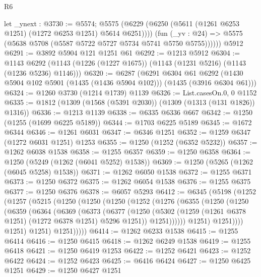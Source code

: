 \begin{lexlean}{R6}
\begin{coremodule}
          let _ynext : @3730 := @5574;
          @5575 (@6229 (@6250 (@5611 (@1261 @6253 @1251) (@1272 @6253 @1251) @5614 @6251))))
          (fun (_yv : @24) => @5575 (@5638 @5708 (@5587 @5722 @5727 @5734 @5741 @5750 @5755))))))
    @5912
@6291 := @3892 @5904 @121 @1251 @61
@6292 := @1213 @5912
@6304 := @1143 @6292 (@1143 (@1226 (@1227 @1675)) (@1143 (@1231 @5216) (@1143 (@1236 @5236) @1146)))
@6320 := @6287
    (@6291
      @6304
      @61
      @6292
      (@1430 @5904 @102 @5901 (@1435 (@1436 @5904 @102)))
      (@1435 (@3916 @6304 @61)))
@6324 := @1260 @3730 (@1214 @1739) @1139
@6326 := List.casesOn.{0, 0} @1152
@6335 := @1812 (@1309 (@1568 (@5391 @2030)) (@1309 (@1313 (@131 @1826)) @1316))
@6336 := @1213 @1139
@6338 := @6335 @6336 @667
@6342 := @1250 (@1255 (@1699 @6225 @5189))
@6344 := @1703 @6225 @5189
@6345 := @1672 @6344
@6346 := @1261 @6031
@6347 := @6346 @1251
@6352 := @1259 @6347 (@1272 @6031 @1251) @1253
@6355 := @1250 (@1252 (@6352 @5232))
@6357 := @1262 @6038 @1538
@6358 := @1255 @6357
@6359 := @1250 @6358
@6364 := @1250 (@5249 (@1262 (@6041 @5252) @1538))
@6369 := @1250 (@5265 (@1262 (@6045 @5258) @1538))
@6371 := @1262 @6050 @1538
@6372 := @1255 @6371
@6373 := @1250 @6372
@6375 := @1262 @6054 @1538
@6376 := @1255 @6375
@6377 := @1250 @6376
@6378 := @6057 @5293
@6412 := @6345
    (@5198
      (@1252
        (@1257
          (@5215
            (@1250
              (@1250
                (@1250
                  (@1252
                    (@1276
                      (@6355
                        (@1250
                          (@1250
                            (@6359
                              (@6364
                                (@6369
                                  (@6373
                                    (@6377
                                      (@1250
                                        (@5302
                                          (@1259
                                            (@1261 @6378 @1251)
                                            (@1272 @6378 @1251)
                                            @5296
                                            @1251))
                                        @1251))))))
                            @1251)
                          @1251))))
                  @1251)
                @1251)
              @1251)))))
@6414 := @1262 @6233 @1538
@6415 := @1255 @6414
@6416 := @1250 @6415
@6418 := @1262 @6249 @1538
@6419 := @1255 @6418
@6421 := @1250 @6419 @1253
@6422 := @1252 @6421
@6423 := @1252 @6422
@6424 := @1252 @6423
@6425 := @6416 @6424
@6427 := @1250 @6425 @1251
@6429 := @1250 @6427 @1251

\end{coremodule}
\end{lexlean}
